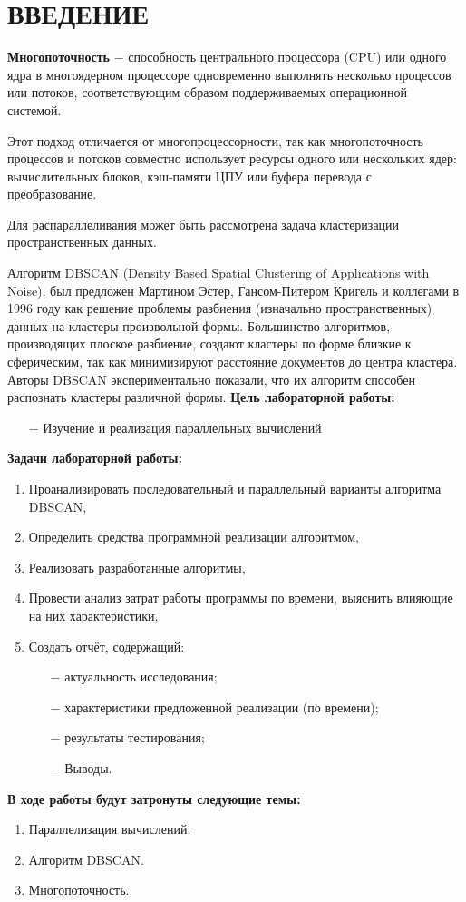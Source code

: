 \chapter*{ВВЕДЕНИЕ}

\textbf{Многопоточность} $-$ способность центрального процессора (CPU) или одного ядра в многоядерном процессоре одновременно выполнять несколько процессов или потоков, соответствующим образом поддерживаемых операционной системой.

Этот подход отличается от многопроцессорности, так как многопоточность процессов и потоков совместно использует ресурсы одного или нескольких ядер: вычислительных блоков, кэш-памяти ЦПУ или буфера перевода с преобразование.

Для распараллеливания может быть рассмотрена задача кластеризации пространственных данных. 

Алгоритм DBSCAN (Density Based Spatial Clustering of Applications with Noise), был предложен Мартином Эстер, Гансом-Питером Кригель и коллегами в 1996 году как решение проблемы разбиения (изначально пространственных) данных на кластеры произвольной формы. 
Большинство алгоритмов, производящих плоское разбиение, создают кластеры по форме близкие к сферическим, так как минимизируют расстояние документов до центра кластера.
Авторы DBSCAN экспериментально показали, что их алгоритм способен распознать кластеры различной формы.
\clearpage
\textbf{Цель лабораторной работы:}
\begin{itemize}
    \item[$-$] Изучение и реализация параллельных вычислений
\end{itemize}

\textbf{Задачи лабораторной работы:}
\begin{enumerate}
    \item Проанализировать последовательный и параллельный варианты алгоритма DBSCAN,
    \item Определить средства программной реализации алгоритмом,
    \item Реализовать разработанные алгоритмы,
    \item Провести анализ затрат работы программы по времени, выяснить влияющие на них характеристики,
    \item Создать отчёт, содержащий:
    \begin{enumerate}
        \item[$-$] актуальность исследования;
        \item[$-$] характеристики предложенной реализации (по времени);
        \item[$-$] результаты тестирования;
        \item[$-$] Выводы.
    \end{enumerate}
\end{enumerate}

\textbf{В ходе работы будут затронуты следующие темы:}
\begin{enumerate}
\item Параллелизация вычислений.
\item Алгоритм DBSCAN.
\item Многопоточность.
\end{enumerate}
